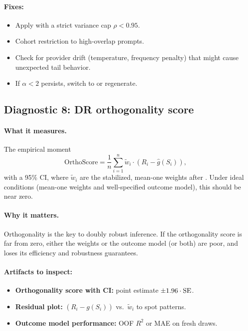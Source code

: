 \paragraph{Fixes:}
\begin{itemize}
\item Apply \simcal{} with a strict variance cap $\rho < 0.95$.
\item Cohort restriction to high-overlap prompts.
\item Check for provider drift (temperature, frequency penalty) that might cause unexpected tail behavior.
\item If $\alpha < 2$ persists, switch to \dr{} or regenerate.
\end{itemize}

\subsection{Diagnostic 8: DR orthogonality score}

\paragraph{What it measures.} The empirical moment
\begin{equation}
\text{OrthoScore} = \frac{1}{n} \sum_{i=1}^n \tilde{w}_i \cdot (R_i - \hat{g}(S_i)),
\end{equation}
with a 95\% CI, where $\tilde{w}_i$ are the stabilized, mean-one weights after \simcal. Under ideal conditions (mean-one weights and well-specified outcome model), this should be near zero.

\paragraph{Why it matters.} Orthogonality is the key to doubly robust inference. If the orthogonality score is far from zero, either the weights or the outcome model (or both) are poor, and \dr{} loses its efficiency and robustness guarantees.

\paragraph{Artifacts to inspect:}
\begin{itemize}
\item \textbf{Orthogonality score with CI:} point estimate $\pm 1.96 \cdot \operatorname{SE}$.
\item \textbf{Residual plot:} $(R_i - \hat{g}(S_i))$ vs.\ $\tilde{w}_i$ to spot patterns.
\item \textbf{Outcome model performance:} OOF $R^2$ or MAE on fresh draws.
\end{itemize}

